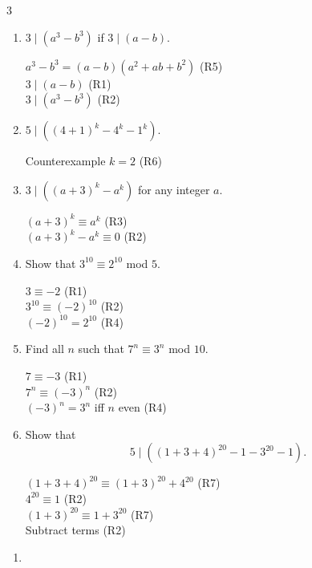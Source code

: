 \documentclass[9pt]{article}
\begin{document}
\begin{multicols}{3}
\begin{enumerate}
\item $3\mid(a^3 - b^3)$ if $3\mid(a-b)$.
\begin{solutionbox}
$a^3 - b^3 = (a - b)(a^2 + ab + b^2)$ \hfill (R5)\\
$3 \mid (a - b)$ \hfill (R1)\\
$3 \mid (a^3 - b^3)$ \hfill (R2)
\end{solutionbox}

\item $5\mid((4+1)^k - 4^k - 1^k)$.
\begin{solutionbox}
Counterexample $k=2$ \hfill (R6)
\end{solutionbox}

\item $3\mid((a+3)^k - a^k)$ for any integer $a$.
\begin{solutionbox}
$(a+3)^k \equiv a^k$ \hfill (R3)\\
$(a+3)^k - a^k \equiv 0$ \hfill (R2)
\end{solutionbox}

\item Show that $3^{10}\equiv 2^{10}$ mod $5$.
\begin{solutionbox}
$3 \equiv -2$ \hfill (R1)\\
$3^{10} \equiv (-2)^{10}$ \hfill (R2)\\
$(-2)^{10} = 2^{10}$ \hfill (R4)
\end{solutionbox}

\item Find all $n$ such that $7^{n}\equiv 3^{n}$ mod $10$.
\begin{solutionbox}
$7 \equiv -3$ \hfill (R1)\\
$7^n \equiv (-3)^n$ \hfill (R2)\\
$(-3)^n = 3^n$ iff $n$ even \hfill (R4)
\end{solutionbox}

\item Show that 
\[
5 \mid ( (1+3+4)^{20} - 1 - 3^{20} - 1 ).
\]
\begin{solutionbox}
$(1+3+4)^{20} \equiv (1+3)^{20} + 4^{20}$ \hfill (R7)\\
$4^{20} \equiv 1$ \hfill (R2)\\
$(1+3)^{20} \equiv 1 + 3^{20}$ \hfill (R7)\\
Subtract terms \hfill (R2)
\end{solutionbox}

\end{enumerate}

\begin{enumerate}
\item

\end{enumerate}
\end{multicols}
\end{document}
